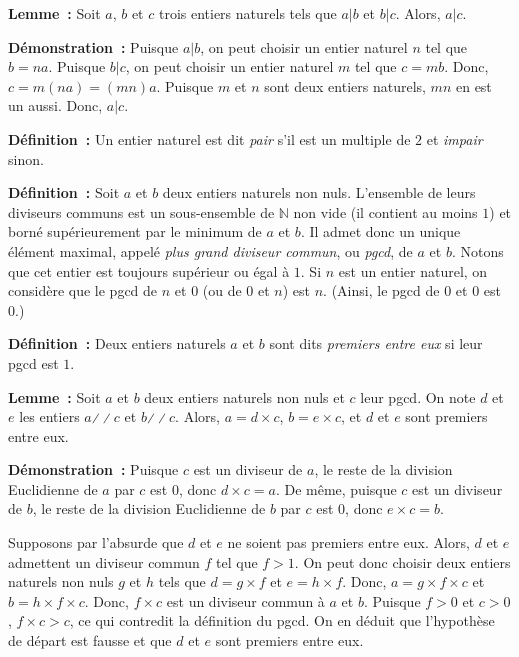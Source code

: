 \medskip

\noindent\textbf{Lemme :} 
    Soit $a$, $b$ et $c$ trois entiers naturels tels que $a \vert b$ et $b \vert c$.
    Alors, $a \vert c$.

\medskip

\noindent\textbf{Démonstration :}
    Puisque $a \vert b$, on peut choisir un entier naturel $n$ tel que $b = n a$.
    Puisque $b \vert c$, on peut choisir un entier naturel $m$ tel que $c = m b$.
    Donc, $c = m (n a) = (m n) a$.
    Puisque $m$ et $n$ sont deux entiers naturels, $m n$ en est un aussi.
    Donc, $a \vert c$.

    \done

\medskip

\noindent\textbf{Définition :} Un entier naturel est dit \textit{pair} s'il est un multiple de $2$ et \textit{impair} sinon. 

\medskip

\noindent\textbf{Définition :} Soit $a$ et $b$ deux entiers naturels non nuls. L'ensemble de leurs diviseurs communs est un sous-ensemble de $\mathbb{N}$ non vide (il contient au moins $1$) et borné supérieurement par le minimum de $a$ et $b$. Il admet donc un unique élément maximal, appelé \textit{plus grand diviseur commun}, ou \textit{pgcd}, de $a$ et $b$.
    Notons que cet entier est toujours supérieur ou égal à $1$. 
    Si $n$ est un entier naturel, on considère que le pgcd de $n$ et $0$ (ou de $0$ et $n$) est $n$.
    (Ainsi, le pgcd de $0$ et $0$ est $0$.)

\medskip

\noindent\textbf{Définition :} Deux entiers naturels $a$ et $b$ sont dits \textit{premiers entre eux} si leur pgcd est $1$.

\medskip

\noindent\textbf{Lemme :} Soit $a$ et $b$ deux entiers naturels non nuls et $c$ leur pgcd.
    On note $d$ et $e$ les entiers $a \mathrel{\divslash\!\divslash} c$ et $b \mathrel{\divslash\!\divslash} c$. 
    Alors, $a = d \times c$, $b = e \times c$, et $d$ et $e$ sont premiers entre eux.

\medskip

\noindent\textbf{Démonstration :} 
    Puisque $c$ est un diviseur de $a$, le reste de la division Euclidienne de $a$ par $c$ est $0$, donc $d \times c = a$.
    De même, puisque $c$ est un diviseur de $b$, le reste de la division Euclidienne de $b$ par $c$ est $0$, donc $e \times c = b$.

    Supposons par l'absurde que $d$ et $e$ ne soient pas premiers entre eux. 
    Alors, $d$ et $e$ admettent un diviseur commun $f$ tel que $f > 1$.
    On peut donc choisir deux entiers naturels non nuls $g$ et $h$ tels que $d = g \times f$ et $e = h \times f$.
    Donc, $a = g \times f \times c$ et $b = h \times f \times c$. 
    Donc, $f \times c$ est un diviseur commun à $a$ et $b$. 
    Puisque $f > 0$ et $c > 0$, $f \times c > c$, ce qui contredit la définition du pgcd. 
    On en déduit que l'hypothèse de départ est fausse et que $d$ et $e$ sont premiers entre eux. 

